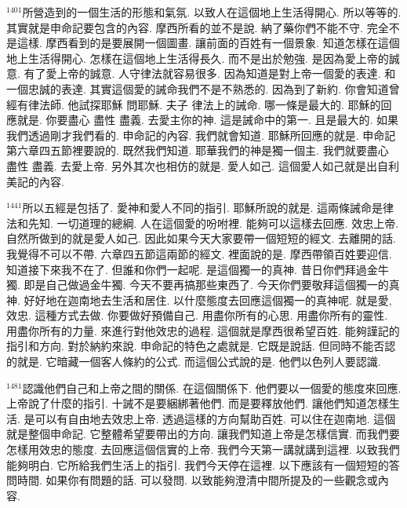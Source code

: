 \documentclass{book}
\begin{document}
$^{1401}$所營造到的一個生活的形態和氣氛.
以致人在這個地上生活得開心.
所以等等的.
其實就是申命記要包含的內容.
摩西所看的並不是說.
納了藥你們不能不守.
完全不是這樣.
摩西看到的是要展開一個圖畫.
讓前面的百姓有一個景象.
知道怎樣在這個地上生活得開心.
怎樣在這個地上生活得長久.
而不是出於勉強.
是因為愛上帝的誠意.
有了愛上帝的誠意.
人守律法就容易很多.
因為知道是對上帝一個愛的表達.
和一個忠誠的表達.
其實這個愛的誡命我們不是不熟悉的.
因為到了新約.
你會知道曾經有律法師.
他試探耶穌 問耶穌.
夫子 律法上的誡命.
哪一條是最大的.
耶穌的回應就是.
你要盡心 盡性 盡義.
去愛主你的神.
這是誡命中的第一.
且是最大的.
如果我們透過剛才我們看的.
申命記的內容.
我們就會知道.
耶穌所回應的就是.
申命記第六章四五節裡要說的.
既然我們知道.
耶華我們的神是獨一個主.
我們就要盡心 盡性 盡義.
去愛上帝.
另外其次也相仿的就是.
愛人如己.
這個愛人如己就是出自利美記的內容.

$^{1441}$所以五經是包括了.
愛神和愛人不同的指引.
耶穌所說的就是.
這兩條誡命是律法和先知.
一切道理的總綱.
人在這個愛的吩咐裡.
能夠可以這樣去回應.
效忠上帝.
自然所做到的就是愛人如己.
因此如果今天大家要帶一個短短的經文.
去離開的話.
我覺得不可以不帶.
六章四五節這兩節的經文.
裡面說的是.
摩西帶領百姓要迎信.
知道接下來我不在了.
但誰和你們一起呢.
是這個獨一的真神.
昔日你們拜過金牛獨.
即是自己做過金牛獨.
今天不要再搞那些東西了.
今天你們要敬拜這個獨一的真神.
好好地在迦南地去生活和居住.
以什麼態度去回應這個獨一的真神呢.
就是愛,效忠.
這種方式去做.
你要做好預備自己.
用盡你所有的心思.
用盡你所有的靈性.
用盡你所有的力量.
來進行對他效忠的過程.
這個就是摩西很希望百姓.
能夠謹記的指引和方向.
對於納約來說.
申命記的特色之處就是.
它既是說話.
但同時不能否認的就是.
它暗藏一個客人條約的公式.
而這個公式說的是.
他們以色列人要認識.

$^{1481}$認識他們自己和上帝之間的關係.
在這個關係下.
他們要以一個愛的態度來回應.
上帝說了什麼的指引.
十誡不是要綑綁著他們.
而是要釋放他們.
讓他們知道怎樣生活.
是可以有自由地去效忠上帝.
透過這樣的方向幫助百姓.
可以住在迦南地.
這個就是整個申命記.
它整體希望要帶出的方向.
讓我們知道上帝是怎樣信實.
而我們要怎樣用效忠的態度.
去回應這個信實的上帝.
我們今天第一講就講到這裡.
以致我們能夠明白.
它所給我們生活上的指引.
我們今天停在這裡.
以下應該有一個短短的答問時間.
如果你有問題的話.
可以發問.
以致能夠澄清中間所提及的一些觀念或內容.
\newpage
\end{document}
